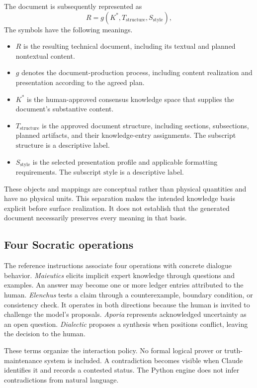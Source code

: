 \documentclass[12pt,a4paper]{article}
\newcommand{\K}{K^{*}}
\begin{document}
The document is subsequently represented as
\begin{equation}
 R=g(\K,T_{\mathrm{structure}},S_{\mathrm{style}}),
\end{equation}
The symbols have the following meanings.
\begin{itemize}
\item $R$ is the resulting technical document, including its textual and planned nontextual content.
\item $g$ denotes the document-production process, including content realization and presentation according to the agreed plan.
\item $\K$ is the human-approved consensus knowledge space that supplies the document's substantive content.
\item $T_{\mathrm{structure}}$ is the approved document structure, including sections, subsections, planned artifacts, and their knowledge-entry assignments. The subscript $\mathrm{structure}$ is a descriptive label.
\item $S_{\mathrm{style}}$ is the selected presentation profile and applicable formatting requirements. The subscript $\mathrm{style}$ is a descriptive label.
\end{itemize}
These objects and mappings are conceptual rather than physical quantities and have no physical units. This separation makes the intended knowledge basis explicit before surface realization. It does not establish that the generated document necessarily preserves every meaning in that basis.

\subsection{Four Socratic operations}
The reference instructions associate four operations with concrete dialogue behavior. \emph{Maieutics} elicits implicit expert knowledge through questions and examples. An answer may become one or more ledger entries attributed to the human. \emph{Elenchus} tests a claim through a counterexample, boundary condition, or consistency check. It operates in both directions because the human is invited to challenge the model's proposals. \emph{Aporia} represents acknowledged uncertainty as an open question. \emph{Dialectic} proposes a synthesis when positions conflict, leaving the decision to the human.

These terms organize the interaction policy. No formal logical prover or truth-maintenance system is included. A contradiction becomes visible when Claude identifies it and records a contested status. The Python engine does not infer contradictions from natural language.
\end{document}
